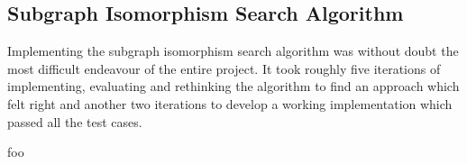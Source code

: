 
\subsection{Subgraph Isomorphism Search Algorithm}
\label{sec:impl_subgraph_isomorphism_search_algorithm}

Implementing the subgraph isomorphism search algorithm was without doubt the most difficult endeavour of the entire project. It took roughly five iterations of implementing, evaluating and rethinking the algorithm to find an approach which felt right and another two iterations to develop a working implementation which passed all the test cases.

foo

